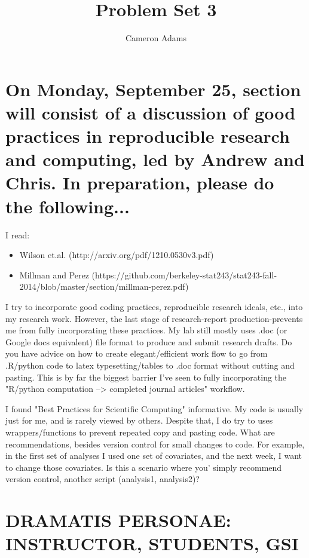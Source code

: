 \documentclass{article}\usepackage[]{graphicx}\usepackage[]{color}
\title{Problem Set 3}
\author{Cameron Adams}
\begin{document}

\maketitle





\section{On Monday, September 25, section will consist of a discussion of good practices in reproducible
research and computing, led by Andrew and Chris. In preparation, please do the following...}

I read: 
\begin{itemize}
    \item Wilson et.al. (http://arxiv.org/pdf/1210.0530v3.pdf)
    \item Millman and Perez (https://github.com/berkeley-stat243/stat243-fall-2014/blob/master/section/millman-perez.pdf)
\end{itemize}

I try to incorporate good coding practices, reproducible research ideals, etc., into my research work. However, the last stage of research-report production-prevents me from fully incorporating these practices. My lab still mostly uses .doc (or Google docs equivalent) file format to produce and submit research drafts. Do you have advice on how to create elegant/efficient work flow to go from .R/python code to latex typesetting/tables to .doc format without cutting and pasting. This is by far the biggest barrier I've seen to fully incorporating the "R/python computation --> completed journal articles" workflow.

I found "Best Practices for Scientific Computing" informative. My code is usually just for me, and is rarely viewed by others. Despite that, I do try to uses wrappers/functions to prevent repeated copy and pasting code. What are recommendations, besides version control for small changes to code. For example, in the first set of analyses I used one set of covariates, and the next week, I want to change those covariates. Is this a scenario where you’ simply recommend version control, another script (analysis1, analysis2)?
 

\section{DRAMATIS PERSONAE: INSTRUCTOR, STUDENTS, GSI} %
\end{document}
